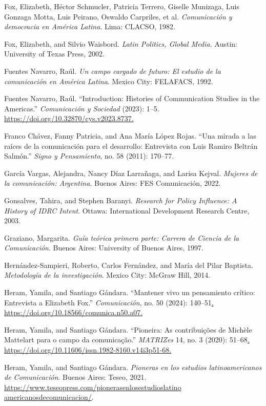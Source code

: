 \documentclass{tufte-handout}
\begin{document}
\begin{hangparas}{.25in}{1}
Fox, Elizabeth, Héctor Schmucler, Patricia Terrero, Giselle Munizaga,
Luis Gonzaga Motta, Luis Peirano, Oswaldo Carpriles, et al.
\emph{Comunicación y democracia en América Latina}. Lima: CLACSO, 1982.

Fox, Elizabeth, and Silvio Waisbord. \emph{Latin Politics, Global
Media.} Austin: University of Texas Press, 2002.

Fuentes Navarro, Raúl. \emph{Un campo cargado de futuro: El estudio de
la comunicación en América Latina}. Mexico City: FELAFACS, 1992.

Fuentes Navarro, Raúl. ``Introduction: Histories of Communication
Studies in the Americas.'' \emph{Comunicación y Sociedad} (2023): 1--5.
\href{https://doi.org/10.32870/cys.v2023.8737}{https://doi.org/10.32870/cys.v2023.8737.}

Franco Chávez, Fanny Patricia, and Ana María López Rojas. ``Una mirada a
las raíces de la comunicación para el desarrollo: Entrevista con Luis
Ramiro Beltrán Salmón.'' \emph{Signo y Pensamiento}, no. 58 (2011):
170--77.

García Vargas, Alejandra, Nancy Díaz Larrañaga, and Larisa Kejval.
\emph{Mujeres de la comunicación: Argentina}. Buenos Aires: FES
Comunicación, 2022.

Gonsalves, Tahira, and Stephen Baranyi. \emph{Research for Policy
Influence: A History of IDRC Intent}. Ottawa: International Development
Research Centre, 2003.

Graziano, Margarita. \emph{Guía teórica primera parte: Carrera de
Ciencia de la Comunicación}. Buenos Aires: University of Buenos Aires,
1997.

Hernández-Sampieri, Roberto, Carlos Fernández, and María del Pilar
Baptista. \emph{Metodología de la investigación}. Mexico City: McGraw
Hill, 2014.

Heram, Yamila, and Santiago Gándara. ``Mantener vivo un pensamiento
crítico: Entrevista a Elizabeth Fox.'' \emph{Comunicación}, no. 50
(2024): 140--51\href{https://doi.org/10.18566/comunica.n50.a07}{.
https://doi.org/10.18566/comunica.n50.a07.}

Heram, Yamila, and Santiago Gándara. ``Pioneira: As contribuições de
Michèle Mattelart para o campo da comunicação.'' \emph{MATRIZes} 14, no.
3 (2020):
51­--68\href{https://doi.org/10.11606/issn.1982-8160.v14i3p51-68}{.
https://doi.org/10.11606/issn.1982-8160.v14i3p51-68.}

Heram, Yamila, and Santiago Gándara. \emph{Pioneras en los estudios
latinoamericanos de Comunicación}. Buenos Aires: Teseo, 2021. \\\hspace{.25in}\href{https://www.teseopress.com/pionerasenlosestudioslatinoamericanosdecomunicacion}{https://www.teseopress.com/pionerasenlosestudioslatino}\\\hspace{.24in}\href{https://www.teseopress.com/pionerasenlosestudioslatinoamericanosdecomunicacion}{americanosdecomunicacion/}.


\end{hangparas}
\end{document}
